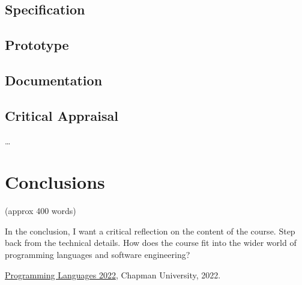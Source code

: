 \documentclass{article}
\theoremstyle{theorem}
\theoremstyle{definition}
\theoremstyle{remark}
\begin{document}
\subsection{Specification}
\subsection{Prototype}
\subsection{Documentation}
\subsection{Critical Appraisal}

\ldots

\section{Conclusions}\label{conclusions}

(approx 400 words)

In the conclusion, I want a critical reflection on the content of the course. Step back from the technical details. How does the course fit into the wider world of programming languages and software engineering?

\begin{thebibliography}{99}
 \href{https://github.com/alexhkurz/programming-languages-2022/blob/main/README.md}{Programming Languages 2022}, Chapman University, 2022.
\end{thebibliography}
\end{document}
